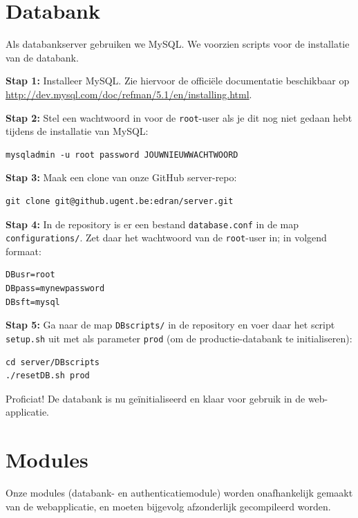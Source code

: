 \documentclass[11pt,a4paper,oneside]{article}
\begin{document}
\section{Databank}
Als databankserver gebruiken we MySQL. We voorzien scripts voor de installatie van de databank.

\textbf{Stap 1:} Installeer MySQL. Zie hiervoor de offici\"ele documentatie beschikbaar op \url{http://dev.mysql.com/doc/refman/5.1/en/installing.html}.\par
\textbf{Stap 2:} Stel een wachtwoord in voor de \verb|root|-user als je dit nog niet gedaan hebt tijdens de installatie van MySQL:
\vspace{-1.7em}\begin{lstlisting}
mysqladmin -u root password JOUWNIEUWWACHTWOORD
\end{lstlisting}\par
\textbf{Stap 3:} Maak een clone van onze GitHub server-repo:
\vspace{-1.7em}\begin{lstlisting}
git clone git@github.ugent.be:edran/server.git
\end{lstlisting}\par
\textbf{Stap 4:} In de repository is er een bestand \verb|database.conf| in de map \verb|configurations/|. Zet daar het wachtwoord van de \verb|root|-user in; in volgend formaat:
\vspace{-1.7em}\begin{lstlisting}
DBusr=root
DBpass=mynewpassword
DBsft=mysql
\end{lstlisting}\par
\textbf{Stap 5:} Ga naar de map \verb|DBscripts/| in de repository en voer daar het script \verb|setup.sh| uit met als parameter \verb|prod| (om de productie-databank te initialiseren):
\vspace{-1.7em}\begin{lstlisting}
cd server/DBscripts
./resetDB.sh prod
\end{lstlisting}\par
Proficiat! De databank is nu ge\"initialiseerd en klaar voor gebruik in de web-applicatie.

\section{Modules}
Onze modules (databank- en authenticatiemodule) worden onafhankelijk gemaakt van de webapplicatie, en moeten bijgevolg afzonderlijk gecompileerd worden.
\end{document}
